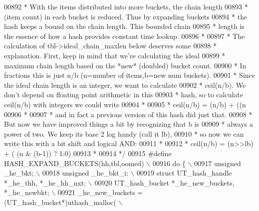 \begin{DoxyCode}
{{{{{{{{00892 \textcolor{comment}{ * With the items distributed into more buckets, the chain length}
00893 \textcolor{comment}{ * (item count) in each bucket is reduced. Thus by expanding buckets}
00894 \textcolor{comment}{ * the hash keeps a bound on the chain length. This bounded chain}
00895 \textcolor{comment}{ * length is the essence of how a hash provides constant time lookup.}
00896 \textcolor{comment}{ *}
00897 \textcolor{comment}{ * The calculation of tbl->ideal\_chain\_maxlen below deserves some}
00898 \textcolor{comment}{ * explanation. First, keep in mind that we're calculating the ideal}
00899 \textcolor{comment}{ * maximum chain length based on the *new* (doubled) bucket count.}
00900 \textcolor{comment}{ * In fractions this is just n/b (n=number of items,b=new num buckets).}
00901 \textcolor{comment}{ * Since the ideal chain length is an integer, we want to calculate}
00902 \textcolor{comment}{ * ceil(n/b). We don't depend on floating point arithmetic in this}
00903 \textcolor{comment}{ * hash, so to calculate ceil(n/b) with integers we could write}
00904 \textcolor{comment}{ *}
00905 \textcolor{comment}{ *      ceil(n/b) = (n/b) + ((n%
00906 \textcolor{comment}{ *}
00907 \textcolor{comment}{ * and in fact a previous version of this hash did just that.}
00908 \textcolor{comment}{ * But now we have improved things a bit by recognizing that b is}
00909 \textcolor{comment}{ * always a power of two. We keep its base 2 log handy (call it lb),}
00910 \textcolor{comment}{ * so now we can write this with a bit shift and logical AND:}
00911 \textcolor{comment}{ *}
00912 \textcolor{comment}{ *      ceil(n/b) = (n>>lb) + ( (n & (b-1)) ? 1:0)}
00913 \textcolor{comment}{ *}
00914 \textcolor{comment}{ */}
00915 \textcolor{preprocessor}{#define HASH\_EXPAND\_BUCKETS(hh,tbl,oomed)                                        \(\backslash\)}
00916 \textcolor{preprocessor}{do \{                                                                             \(\backslash\)}
00917 \textcolor{preprocessor}{  unsigned \_he\_bkt;                                                              \(\backslash\)}
00918 \textcolor{preprocessor}{  unsigned \_he\_bkt\_i;                                                            \(\backslash\)}
00919 \textcolor{preprocessor}{  struct UT\_hash\_handle *\_he\_thh, *\_he\_hh\_nxt;                                   \(\backslash\)}
00920 \textcolor{preprocessor}{  UT\_hash\_bucket *\_he\_new\_buckets, *\_he\_newbkt;                                  \(\backslash\)}
00921 \textcolor{preprocessor}{  \_he\_new\_buckets = (UT\_hash\_bucket*)uthash\_malloc(                              \(\backslash\)}
}}}}}}}}}
\end{DoxyCode}
